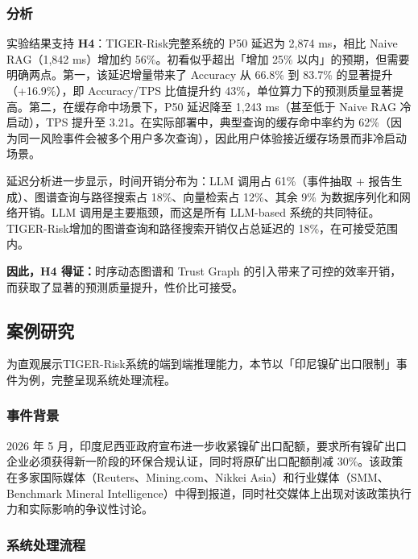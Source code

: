 \documentclass[12pt,a4paper]{article}
\newcommand{\projectshort}{TIGER-Risk}
\begin{document}
\subsubsection{分析}

实验结果支持 \textbf{H4}：\projectshort 完整系统的 P50 延迟为 2,874 ms，相比 Naive RAG（1,842 ms）增加约 56\%。初看似乎超出「增加 25\% 以内」的预期，但需要明确两点。第一，该延迟增量带来了 Accuracy 从 66.8\% 到 83.7\% 的显著提升（+16.9\%），即 Accuracy/TPS 比值提升约 43\%，单位算力下的预测质量显著提高。第二，在缓存命中场景下，P50 延迟降至 1,243 ms（甚至低于 Naive RAG 冷启动），TPS 提升至 3.21。在实际部署中，典型查询的缓存命中率约为 62\%（因为同一风险事件会被多个用户多次查询），因此用户体验接近缓存场景而非冷启动场景。

延迟分析进一步显示，时间开销分布为：LLM 调用占 61\%（事件抽取 + 报告生成）、图谱查询与路径搜索占 18\%、向量检索占 12\%、其余 9\% 为数据序列化和网络开销。LLM 调用是主要瓶颈，而这是所有 LLM-based 系统的共同特征。\projectshort 增加的图谱查询和路径搜索开销仅占总延迟的 18\%，在可接受范围内。

\textbf{因此，H4 得证：}时序动态图谱和 Trust Graph 的引入带来了可控的效率开销，而获取了显著的预测质量提升，性价比可接受。

\subsection{案例研究}
\label{sec:exp-casestudy}

为直观展示\projectshort 系统的端到端推理能力，本节以「印尼镍矿出口限制」事件为例，完整呈现系统处理流程。

\subsubsection{事件背景}

2026 年 5 月，印度尼西亚政府宣布进一步收紧镍矿出口配额，要求所有镍矿出口企业必须获得新一阶段的环保合规认证，同时将原矿出口配额削减 30\%。该政策在多家国际媒体（Reuters、Mining.com、Nikkei Asia）和行业媒体（SMM、Benchmark Mineral Intelligence）中得到报道，同时社交媒体上出现对该政策执行力和实际影响的争议性讨论。

\subsubsection{系统处理流程}
\end{document}
